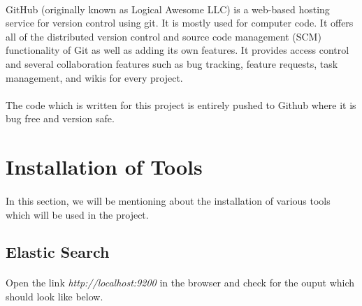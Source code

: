 \documentclass{article}
\begin{document}
\paragraph{}
GitHub (originally known as Logical Awesome LLC) is a web-based hosting service for version control using git. It is mostly used for computer code. It offers all of the distributed version control and source code management (SCM) functionality of Git as well as adding its own features. It provides access control and several collaboration features such as bug tracking, feature requests, task management, and wikis for every project.

\paragraph{}
The code which is written for this project is entirely pushed to Github where it is bug free and version safe.

\section{Installation of Tools}
\paragraph{}
In this section, we will be mentioning about the installation of various tools which will be used in the project.

\subsection{Elastic Search}


\paragraph{}
Open the link \textit{http://localhost:9200} in the browser and check for the ouput which should look like below.
\end{document}
